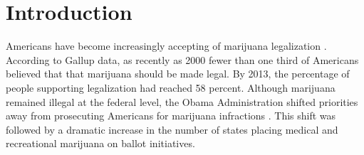 






\section{Introduction}





Americans have become increasingly accepting of marijuana legalization \citep{caulkins_et_al_2012,rosenthal_and_kubby_1996,gallup_2013,pew_2013}. According to Gallup data, as recently as 2000 fewer than one third of Americans believed that that marijuana should be made legal. By 2013, the percentage of people supporting legalization had reached 58 percent. Although marijuana remained illegal at the federal level, the Obama Administration shifted priorities away from prosecuting Americans for marijuana infractions \citep{ogden_2009}. This shift was followed by a dramatic increase in the number of states placing medical and recreational marijuana on ballot initiatives. 

